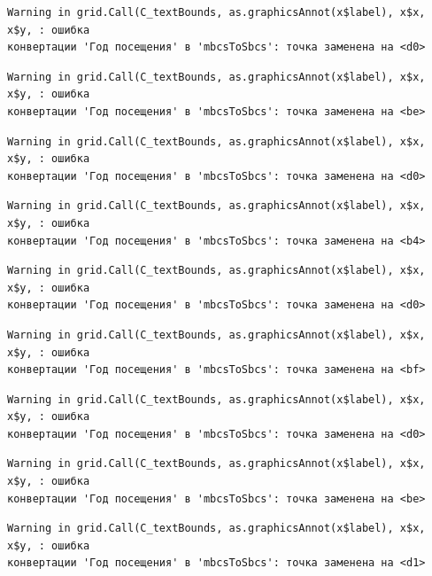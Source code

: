 \documentclass[
  letterpaper,
  DIV=11,
  numbers=noendperiod]{scrreprt}
\begin{document}
\begin{verbatim}
Warning in grid.Call(C_textBounds, as.graphicsAnnot(x$label), x$x, x$y, : ошибка
конвертации 'Год посещения' в 'mbcsToSbcs': точка заменена на <d0>
\end{verbatim}

\begin{verbatim}
Warning in grid.Call(C_textBounds, as.graphicsAnnot(x$label), x$x, x$y, : ошибка
конвертации 'Год посещения' в 'mbcsToSbcs': точка заменена на <be>
\end{verbatim}

\begin{verbatim}
Warning in grid.Call(C_textBounds, as.graphicsAnnot(x$label), x$x, x$y, : ошибка
конвертации 'Год посещения' в 'mbcsToSbcs': точка заменена на <d0>
\end{verbatim}

\begin{verbatim}
Warning in grid.Call(C_textBounds, as.graphicsAnnot(x$label), x$x, x$y, : ошибка
конвертации 'Год посещения' в 'mbcsToSbcs': точка заменена на <b4>
\end{verbatim}

\begin{verbatim}
Warning in grid.Call(C_textBounds, as.graphicsAnnot(x$label), x$x, x$y, : ошибка
конвертации 'Год посещения' в 'mbcsToSbcs': точка заменена на <d0>
\end{verbatim}

\begin{verbatim}
Warning in grid.Call(C_textBounds, as.graphicsAnnot(x$label), x$x, x$y, : ошибка
конвертации 'Год посещения' в 'mbcsToSbcs': точка заменена на <bf>
\end{verbatim}

\begin{verbatim}
Warning in grid.Call(C_textBounds, as.graphicsAnnot(x$label), x$x, x$y, : ошибка
конвертации 'Год посещения' в 'mbcsToSbcs': точка заменена на <d0>
\end{verbatim}

\begin{verbatim}
Warning in grid.Call(C_textBounds, as.graphicsAnnot(x$label), x$x, x$y, : ошибка
конвертации 'Год посещения' в 'mbcsToSbcs': точка заменена на <be>
\end{verbatim}

\begin{verbatim}
Warning in grid.Call(C_textBounds, as.graphicsAnnot(x$label), x$x, x$y, : ошибка
конвертации 'Год посещения' в 'mbcsToSbcs': точка заменена на <d1>
\end{verbatim}
\end{document}
